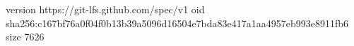 version https://git-lfs.github.com/spec/v1
oid sha256:c167bf76a0f04f0b13b39a5096d16504e7bda83e417a1aa4957eb993e8911fb6
size 7626
